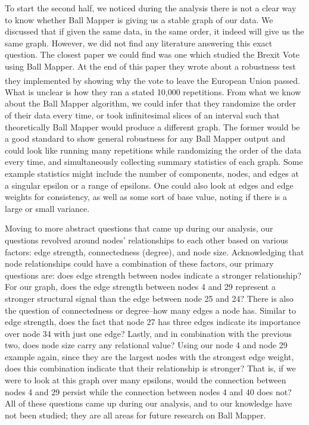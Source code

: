 \documentclass[10pt, letterpaper]{article}
\begin{document}
To start the second half, we noticed during the analysis there is not a
clear way to know whether Ball Mapper is giving us a stable graph of our
data. We discussed that if given the same data, in the same order, it
indeed will give us the same graph. However, we did not find any
literature answering this exact question. The closest paper we could
find was one which studied the Brexit Vote using Ball Mapper. At the end
of this paper they wrote about a robustness test they implemented by
showing why the vote to leave the European Union
passed.\textsuperscript{}
What is unclear is how they ran a stated 10,000 repetitions. From what
we know about the Ball Mapper algorithm, we could infer that they
randomize the order of their data every time, or took infinitesimal
slices of an interval such that theoretically Ball Mapper would produce
a different graph. The former would be a good standard to show general
robustness for any Ball Mapper output and could look like running many
repetitions while randomizing the order of the data every time, and
simultaneously collecting summary statistics of each graph. Some example
statistics might include the number of components, nodes, and edges at a
singular epsilon or a range of epsilons. One could also look at edges
and edge weights for consistency, as well as some sort of base value,
noting if there is a large or small variance.

Moving to more abstract questions that came up during our analysis, our
questions revolved around nodes' relationships to each other based on
various factors: edge strength, connectedness (degree), and node size.
Acknowledging that node relationships could have a combination of these
factors, our primary questions are: does edge strength between nodes
indicate a stronger relationship? For our graph, does the edge strength
between nodes 4 and 29 represent a stronger structural signal than the
edge between node 25 and 24? There is also the question of connectedness
or degree--how many edges a node has. Similar to edge strength, does the
fact that node 27 has three edges indicate its importance over node 34
with just one edge? Lastly, and in combination with the previous two,
does node size carry any relational value? Using our node 4 and node 29
example again, since they are the largest nodes with the strongest edge
weight, does this combination indicate that their relationship is
stronger? That is, if we were to look at this graph over many epsilons,
would the connection between nodes 4 and 29 persist while the connection
between nodes 4 and 40 does not? All of these questions came up during
our analysis, and to our knowledge have not been studied; they are all
areas for future research on Ball Mapper.
\end{document}
